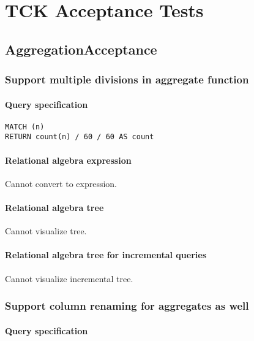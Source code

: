 \chapter{TCK Acceptance Tests}
\label{chp:acceptance-tests}

\section{AggregationAcceptance}

\subsection{Support multiple divisions in aggregate function}

\subsubsection*{Query specification}

\begin{lstlisting}
MATCH (n)
RETURN count(n) / 60 / 60 AS count
\end{lstlisting}

\subsubsection*{Relational algebra expression}

Cannot convert to expression.

\subsubsection*{Relational algebra tree}

Cannot visualize tree.

\subsubsection*{Relational algebra tree for incremental queries}

Cannot visualize incremental tree.

\subsection{Support column renaming for aggregates as well}

\subsubsection*{Query specification}

